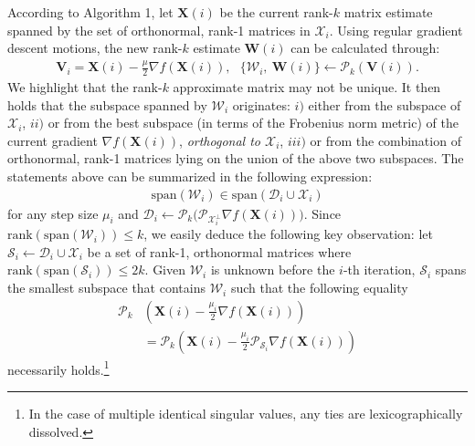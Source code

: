 \documentclass[twocolumn]{svjour3}
\newcommand{\signal}{\boldsymbol{X}}
\newcommand{\rank}{k}
\begin{document}
According to Algorithm 1, let $ \signal(i) $ be the current rank-$ \rank $ matrix estimate spanned by the set of orthonormal, rank-1 matrices in $ \mathcal{X}_i $. Using regular gradient descent motions, the new rank-$ \rank $ estimate $ \boldsymbol{W}(i) $ can be calculated through: 
\begin{align}
\boldsymbol{V}_i = \signal(i) - \frac{\mu}{2} \nabla f(\signal(i)), ~~~\lbrace \mathcal{W}_i,~\boldsymbol{W}(i)\rbrace \leftarrow \mathcal{P}_{\rank}(\boldsymbol{V}(i)). \nonumber
\end{align} We highlight that the rank-$\rank$ approximate matrix may not be unique. It then holds that the subspace spanned by $ \mathcal{W}_i $ originates: $ i) $ either from the subspace of $ \mathcal{X}_i $, $ ii) $ or from the best subspace (in terms of the Frobenius norm metric) of the current gradient $ \nabla f(\signal(i)) $, {\it orthogonal to $ \mathcal{X}_i $}, $ iii) $ or from the combination of orthonormal, rank-1 matrices lying on the union of the above two subspaces. The statements above can be summarized in the following expression:
\begin{align}
\text{span}(\mathcal{W}_i) \in \text{span}\left( \mathcal{D}_i \cup \mathcal{X}_i\right)
\end{align} for any step size $ \mu_i $ and $\mathcal{D}_i \leftarrow \mathcal{P}_{\rank}\big( \mathcal{P}_{\mathcal{X}_i^{\bot}} \nabla f(\signal(i)) \big)$. Since $ \text{rank}(\text{span}(\mathcal{W}_i)) \leq \rank $, we easily deduce the following key observation: let $ \mathcal{S}_i \leftarrow \mathcal{D}_i \cup \mathcal{X}_i $ be a set of rank-1, orthonormal matrices where $ \text{rank}(\text{span}(\mathcal{S}_i)) \leq 2\rank $. 
Given $ \mathcal{W}_{i} $ is unknown before the $ i $-th iteration, $ \mathcal{S}_i $ spans the smallest subspace that contains $ \mathcal{W}_i $ such that the following equality
\begin{align}
\mathcal{P}_{\rank}&\left(\signal(i) - \frac{\mu_i}{2}\nabla f(\signal(i)) \right) \nonumber \\ &= \mathcal{P}_{\rank}\left(\signal(i) - \frac{\mu_i}{2}\mathcal{P}_{\mathcal{S}_i}\nabla f(\signal(i)) \right)
\end{align} necessarily holds.\footnote{In the case of multiple identical singular values, any ties are lexicographically dissolved.}
\end{document}
